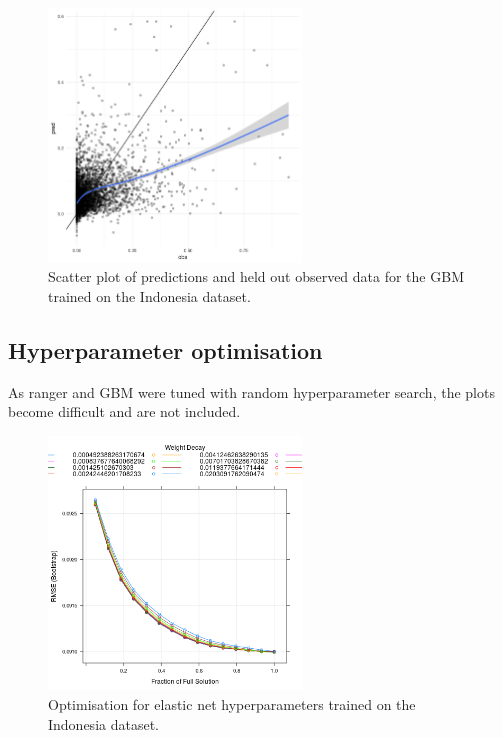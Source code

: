 \documentclass[review]{elsarticle}
\begin{document}
\begin{figure}[h!]
  \centering
  \includegraphics[width=0.6\textwidth]{figs/SI/xgboost_obspred_idn.png}
\caption{
  Scatter plot of predictions and held out observed data for the GBM trained on the Indonesia dataset.
}

\end{figure}


\clearpage
\subsection{Hyperparameter optimisation}

As ranger and GBM were tuned with random hyperparameter search, the plots become difficult and are not included.


\begin{figure}[h!]
  \centering
  \includegraphics[width=0.6\textwidth]{figs/SI/enetopt_idn.png}
\caption{
  Optimisation for elastic net hyperparameters trained on the Indonesia dataset.
}
\end{figure}
\end{document}
